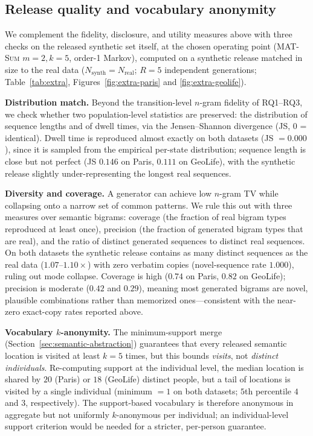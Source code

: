 \documentclass[sigconf,nonacm]{acmart}
\begin{document}
\subsection{Release quality and vocabulary anonymity}
\label{sec:release-quality}
We complement the fidelity, disclosure, and utility measures above with three checks on the released
synthetic set itself, at the chosen operating point (\textsc{MAT-Sum} $m{=}2,k{=}5$, order-1 Markov),
computed on a synthetic release matched in size to the real data ($N_{\text{synth}}{=}N_{\text{real}}$;
$R{=}5$ independent generations; Table~\ref{tab:extra}, Figures~\ref{fig:extra-paris} and
\ref{fig:extra-geolife}).

\textbf{Distribution match.} Beyond the transition-level $n$-gram fidelity of RQ1--RQ3, we check whether
two population-level statistics are preserved: the distribution of sequence lengths and of dwell times,
via the Jensen--Shannon divergence (JS, $0$ = identical). Dwell time is reproduced almost exactly on both
datasets (JS $=0.000$), since it is sampled from the empirical per-state distribution; sequence length is
close but not perfect (JS $0.146$ on Paris, $0.111$ on GeoLife), with the synthetic release slightly
under-representing the longest real sequences.

\textbf{Diversity and coverage.} A generator can achieve low $n$-gram TV while collapsing onto a narrow
set of common patterns. We rule this out with three measures over semantic bigrams: coverage (the
fraction of real bigram types reproduced at least once), precision (the fraction of generated bigram
types that are real), and the ratio of distinct generated sequences to distinct real sequences. On both
datasets the synthetic release contains as many distinct sequences as the real data ($1.07$--$1.10\times$)
with zero verbatim copies (novel-sequence rate $1.000$), ruling out mode collapse. Coverage is high
($0.74$ on Paris, $0.82$ on GeoLife); precision is moderate ($0.42$ and $0.29$), meaning most generated
bigrams are novel, plausible combinations rather than memorized ones---consistent with the near-zero
exact-copy rates reported above.

\textbf{Vocabulary $k$-anonymity.} The minimum-support merge (Section~\ref{sec:semantic-abstraction})
guarantees that every released semantic location is visited at least $k{=}5$ times, but this bounds
\emph{visits}, not \emph{distinct individuals}. Re-computing support at the individual level, the median
location is shared by $20$ (Paris) or $18$ (GeoLife) distinct people, but a tail of locations is visited
by a single individual (minimum $=1$ on both datasets; $5$th percentile $4$ and $3$, respectively). The
support-based vocabulary is therefore anonymous in aggregate but not uniformly $k$-anonymous per
individual; an individual-level support criterion would be needed for a stricter, per-person guarantee.
\end{document}
